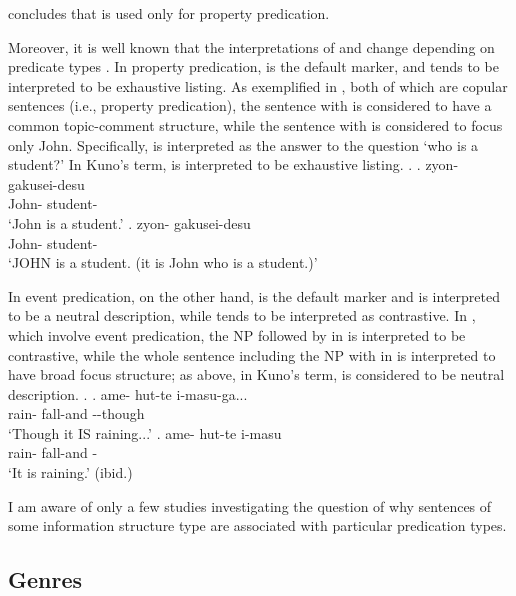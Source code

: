  concludes that
 is used only for property predication.

Moreover, it is well known that
the interpretations of  and  change
depending on predicate types \cite{kuroda72,kuno73}.
In property predication,
 is the default marker, and
 tends to be interpreted to be exhaustive listing.
As exemplified in \Next[a-b], both of which are copular sentences (i.e., property predication),
the sentence with  \Next[a] is considered to have a common topic-comment structure,
while the sentence with  \Next[b] is considered to focus only John.
Specifically, \Next[b] is interpreted as the answer to the question `who is a student?'
In Kuno's term,
 is interpreted to be exhaustive listing.
%
\ex.
 \ag. zyon- gakusei-desu \\
      John- student- \\
      `John is a student.'
 \bg. zyon- gakusei-desu \\
      John- student- \\
      `JOHN is a student. (it is John who is a student.)'
      \hfill{\cite[38]{kuno73}}

In event predication,
on the other hand,
 is the default marker and is interpreted to be a neutral description,
while  tends to be interpreted as contrastive.
In \Next[a-b], which involve event predication,
the NP followed by  in \Next[a] is interpreted to be contrastive,
while the whole sentence including the NP with  in \Next[b] is interpreted to have broad focus structure;
as above, in Kuno's term,
 is considered to be neutral description.
%
\ex.
 \ag. ame- hut-te i-masu-ga... \\
      rain- fall-and --though \\
      `Though it IS raining...'
 \bg. ame- hut-te i-masu \\
      rain- fall-and - \\
      `It is raining.'
      \hfill{(ibid.)}


I am aware of only a few studies investigating the question of
why sentences of some information structure type are associated with
particular predication types.



\subsection{Genres}

